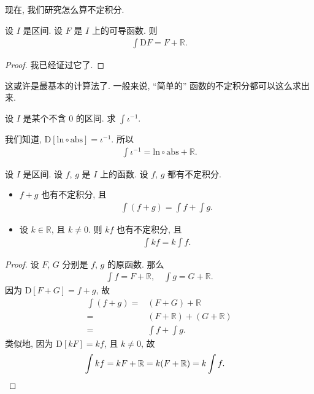 现在, 我们研究怎么算不定积分.

\begin{theorem}
    设 $I$ 是区间. 设 $F$ 是 $I$ 上的可导函数. 则
    \begin{align*}
        \int {\mathrm{D}F} = F + \mathbb{R}.
    \end{align*}
\end{theorem}

\begin{proof}
    我已经证过它了.
\end{proof}

这或许是最基本的计算法了. 一般来说, ``简单的'' 函数的不定积分都可以这么求出来.

\begin{example}
    设 $I$ 是某个不含 $0$ 的区间. 求 $\int {\iota^{-1}}$.

    我们知道, $\mathrm{D}[\mathrm{ln} \circ \mathrm{abs}] = \iota^{-1}$. 所以
    \begin{align*}
        \int {\iota^{-1}} = \mathrm{ln} \circ \mathrm{abs} + \mathbb{R}.
    \end{align*}
\end{example}

\begin{theorem}
    设 $I$ 是区间. 设 $f$, $g$ 是 $I$ 上的函数. 设 $f$, $g$ 都有不定积分.
    \begin{itemize}
        \item $f + g$ 也有不定积分, 且
              \begin{align*}
                  \int {(f + g)} = \int {f} + \int {g}.
              \end{align*}
        \item 设 $k \in \mathbb{R}$, 且 $k \neq 0$. 则 $kf$ 也有不定积分, 且
              \begin{align*}
                  \int {kf} = k \int{f}.
              \end{align*}
    \end{itemize}
\end{theorem}

\begin{proof}
    设 $F$, $G$ 分别是 $f$, $g$ 的原函数. 那么
    \begin{align*}
        \int {f} = F + \mathbb{R}, \quad \int {g} = G + \mathbb{R}.
    \end{align*}
    因为 $\mathrm{D}[F + G] = f + g$, 故
    \begin{align*}
        \int {(f + g)}
        = {} & (F + G) + \mathbb{R}                \\
        = {} & (F + \mathbb{R}) + (G + \mathbb{R}) \\
        = {} & \int {f} + \int {g}.
    \end{align*}
    类似地, 因为 $\mathrm{D}[kF] = kf$, 且 $k \neq 0$, 故
    \begin{align*}
         & {\int {kf}} = kF + \mathbb{R} = k(F + \mathbb{R}) = k\int {f}. \qedhere
    \end{align*}
\end{proof}

